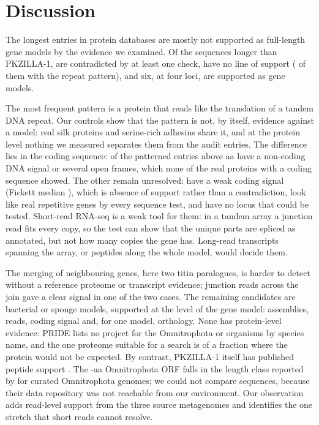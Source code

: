 \documentclass[11pt]{article}
\begin{document}
\section{Discussion}

The longest entries in protein databases are mostly not supported as full-length gene models by the evidence we
examined. Of the  sequences longer than PKZILLA-1,  are contradicted by at least one
check,  have no line of support ( of them with the repeat pattern), and six, at four loci,
are supported as gene models.

The most frequent pattern is a protein that reads like the translation of a tandem DNA repeat. Our controls show that the
pattern is not, by itself, evidence against a model: real silk proteins and serine-rich adhesins share it, and at the
protein level nothing we measured separates them from the audit entries. The difference lies in the coding sequence:
 of the patterned entries above  aa have a non-coding DNA signal or several open frames,
which none of the real proteins with a coding sequence showed. The other  remain unresolved:
 have a weak coding signal (Fickett median ), which is absence
of support rather than a contradiction,  look like real repetitive genes by every sequence test, and
 have no locus that could be tested. Short-read RNA-seq is a weak tool for them: in a tandem array a
junction read fits every copy, so the test can show that the unique parts are spliced as annotated, but not how many
copies the gene has. Long-read transcripts spanning the array, or peptides along the whole model, would decide them.

The merging of neighbouring genes, here two titin paralogues, is harder to detect without a reference proteome or
transcript evidence; junction reads across the join gave a clear signal in one of the two cases. The remaining candidates
are bacterial or sponge models, supported at the level of the gene model: assemblies, reads, coding signal and, for one
 model, orthology. None has protein-level evidence: PRIDE lists no project for the Omnitrophota or
 organisms by species name, and the one  proteome suitable for a search is of a fraction where the
protein would not be expected. By contrast, PKZILLA-1 itself has published peptide support \citep{fallon2024}. The
-aa Omnitrophota ORF falls in the length class reported by \citet{westroberts2023} for curated
Omnitrophota genomes; we could not compare sequences, because their data repository was not reachable from our
environment. Our observation adds read-level support from the three source metagenomes and identifies the one stretch that
short reads cannot resolve.
\end{document}
